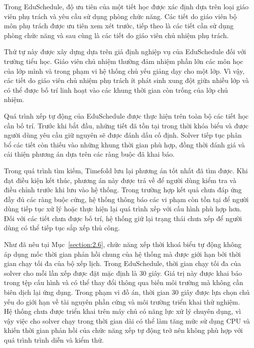 \documentclass[../DoAn.tex]{subfiles}
\begin{document}
Trong EduSchedule, độ ưu tiên của một tiết học được xác định dựa trên loại giáo viên phụ trách và yêu cầu sử dụng phòng chức năng. Các tiết do giáo viên bộ môn phụ trách được ưu tiên xem xét trước, tiếp theo là các tiết cần sử dụng phòng chức năng và sau cùng là các tiết do giáo viên chủ nhiệm phụ trách.

Thứ tự này được xây dựng dựa trên giả định nghiệp vụ của EduSchedule đối với trường tiểu học. Giáo viên chủ nhiệm thường đảm nhiệm phần lớn các môn học của lớp mình và trong phạm vi hệ thống chủ yếu giảng dạy cho một lớp. Vì vậy, các tiết do giáo viên chủ nhiệm phụ trách ít phát sinh xung đột giữa nhiều lớp và có thể được bố trí linh hoạt vào các khung thời gian còn trống của lớp chủ nhiệm.

Quá trình xếp tự động của EduSchedule được thực hiện trên toàn bộ các tiết học cần bố trí. Trước khi bắt đầu, những tiết đã tồn tại trong thời khóa biểu và được người dùng yêu cầu giữ nguyên sẽ được đánh dấu cố định. Solver tiếp tục phân bổ các tiết còn thiếu vào những khung thời gian phù hợp, đồng thời đánh giá và cải thiện phương án dựa trên các ràng buộc đã khai báo.

Trong quá trình tìm kiếm, Timefold lưu lại phương án tốt nhất đã tìm được. Khi đạt điều kiện kết thúc, phương án này được trả về để người dùng kiểm tra và điều chỉnh trước khi lưu vào hệ thống. Trong trường hợp kết quả chưa đáp ứng đầy đủ các ràng buộc cứng, hệ thống thông báo các vi phạm còn tồn tại để người dùng tiếp tục xử lý hoặc thực hiện lại quá trình xếp với cấu hình phù hợp hơn. Đối với các tiết chưa được bố trí, hệ thống giữ lại trạng thái chưa xếp để người dùng có thể tiếp tục sắp xếp thủ công.

Như đã nêu tại Mục~\ref{section:2.6}, chức năng xếp thời khoá biểu tự động không áp dụng mốc thời gian phản hồi chung của hệ thống mà được giới hạn bởi thời gian chạy tối đa của bộ xếp lịch. Trong EduSchedule, thời gian chạy tối đa của solver cho mỗi lần xếp được đặt mặc định là 30 giây. Giá trị này được khai báo trong tệp cấu hình và có thể thay đổi thông qua biến môi trường mà không cần biên dịch lại ứng dụng. Trong phạm vi đồ án, thời gian 30 giây được lựa chọn chủ yếu do giới hạn về tài nguyên phần cứng và môi trường triển khai thử nghiệm. Hệ thống chưa được triển khai trên máy chủ có năng lực xử lý chuyên dụng, vì vậy việc cho solver chạy trong thời gian dài có thể làm tăng mức sử dụng CPU và khiến thời gian phản hồi của chức năng xếp tự động trở nên không phù hợp với quá trình trình diễn và kiểm thử.
\end{document}
